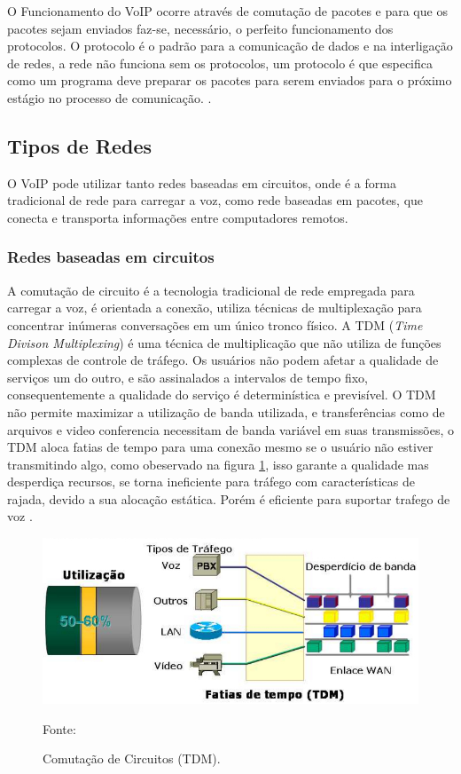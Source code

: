 O Funcionamento do VoIP ocorre através de comutação de pacotes e para que os pacotes sejam enviados faz-se, necessário, o perfeito funcionamento dos protocolos. O protocolo é o padrão para a comunicação de dados e na interligação de redes, a rede não funciona sem os protocolos, um protocolo é que especifica como um programa deve preparar os pacotes para serem enviados para o próximo estágio no processo de comunicação. \cite{andersonramires2005}.

\subsection{Tipos de Redes}
O VoIP pode utilizar tanto redes baseadas em circuitos, onde é a forma  tradicional de rede para carregar a voz, como rede baseadas em pacotes, que conecta e transporta informações entre computadores remotos.

\subsubsection{Redes baseadas em circuitos}
A comutação de circuito é a tecnologia tradicional de rede empregada para carregar a voz, é orientada a conexão, utiliza técnicas de multiplexação para concentrar inúmeras conversações em um único tronco físico. A TDM (\textit{Time Divison Multiplexing}) é uma técnica de multiplicação que não utiliza de funções complexas de controle de tráfego. Os usuários não podem afetar a qualidade de serviços um do outro, e são assinalados a intervalos de tempo fixo, consequentemente a qualidade do serviço é determinística e previsível. O TDM não permite maximizar a utilização de banda utilizada, e transferências como de arquivos e video conferencia necessitam de banda variável em suas transmissões, o TDM aloca fatias de tempo para uma conexão mesmo se o usuário não estiver transmitindo algo, como obeservado na figura \ref{Figura7}, isso garante a qualidade mas desperdiça recursos, se torna ineficiente para tráfego com características de rajada, devido a sua alocação estática. Porém é eficiente
para suportar trafego de voz \cite{thiagowinkler2007}.

\begin{figure}[h]
	\centering
	\includegraphics[width=16.0cm]{imagens/comutacaoCircuitosTDM.jpg}
	\caption{Comutação de Circuitos (TDM).}
    \label{Figura7}
    Fonte: \cite{eduardomaronasmonks2006}
\end{figure}

